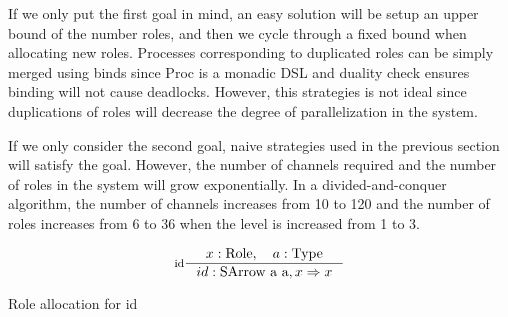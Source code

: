 If we only put the first goal in mind, an easy solution will be setup an upper bound of the number roles, and then we cycle through a fixed bound when allocating new roles. Processes corresponding to duplicated roles can be simply merged using binds since Proc is a monadic DSL and duality check ensures binding will not cause deadlocks. However, this strategies is not ideal since duplications of roles will decrease the degree of parallelization in the system.

If we only consider the second goal, naive strategies used in the previous section will satisfy the goal. However, the number of channels required and the number of roles in the system will grow exponentially. In a divided-and-conquer algorithm, the number of channels increases from 10 to 120 and the number of roles increases from 6 to 36 when the level is increased from 1 to 3.
\begin{listing}[ht]
\begin{displaymath} 
    \inference[id]{x: \text{Role}, \quad a: \text{Type}}{id : \text{SArrow a a}, x \Rightarrow x}
\end{displaymath}
\caption{Role allocation for id}
\label{SArrow:ra:example}
\end{listing}

